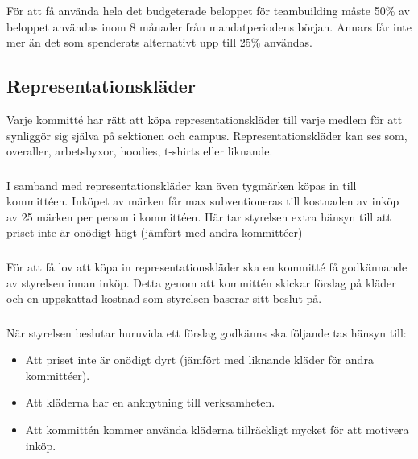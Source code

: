 \documentclass[a4paper, 10pt]{article}
\begin{document}
\subsubsection{}
För att få använda hela det budgeterade beloppet för teambuilding måste 50\% av beloppet användas inom 8 månader från mandatperiodens början. Annars får inte mer än det som spenderats alternativt upp till 25\% användas.


\subsection{Representationskläder}
Varje kommitté har rätt att köpa representationskläder till varje medlem för att synliggör sig själva på sektionen och campus. Representationskläder kan ses som, overaller, arbetsbyxor, hoodies, t-shirts eller liknande.

\subsubsection{}
I samband med representationskläder kan även tygmärken köpas in till kommittéen. Inköpet av märken får max subventioneras till kostnaden av inköp av 25 märken per person i kommittéen. Här tar styrelsen extra hänsyn till att priset inte är onödigt högt (jämfört med andra kommittéer)

\subsubsection{}
För att få lov att köpa in representationskläder ska en kommitté få godkännande av styrelsen innan inköp. Detta genom att kommittén skickar förslag på kläder och en uppskattad kostnad som styrelsen baserar sitt beslut på.

\subsubsection{}
När styrelsen beslutar huruvida ett förslag godkänns ska följande tas hänsyn till:
\begin{itemize}
    \item Att priset inte är onödigt dyrt (jämfört med liknande kläder för andra kommittéer).
    \item Att kläderna har en anknytning till verksamheten.
        \item Att kommittén kommer använda kläderna tillräckligt mycket för att motivera inköp.
\end{itemize}
\end{document}

